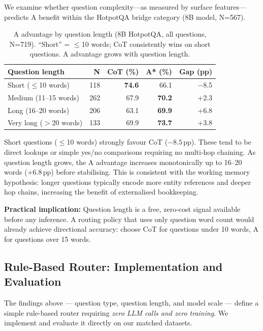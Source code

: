 \documentclass{article}
\begin{document}
We examine whether question complexity---as measured by surface features---predicts A\* benefit within the HotpotQA bridge category (8B model, N=567).

\begin{table}[h]
\centering
\caption{A\* advantage by question length (8B HotpotQA, all questions, N=719). ``Short'' = $\leq$10 words; CoT consistently wins on short questions. A\* advantage grows with question length.}
\label{tab:qlen}
\small
\begin{tabular}{lrrrr}
\toprule
Question length & N & CoT (\%) & A* (\%) & Gap (pp) \\
\midrule
Short ($\leq$10 words)   & 118 & \textbf{74.6} & 66.1 & $-$8.5 \\
Medium (11--15 words) & 262 & 67.9 & \textbf{70.2} & +2.3 \\
Long (16--20 words)   & 206 & 63.1 & \textbf{69.9} & +6.8 \\
Very long ($>$20 words)  & 133 & 69.9 & \textbf{73.7} & +3.8 \\
\bottomrule
\end{tabular}
\end{table}

Short questions ($\leq$10 words) strongly favour CoT ($-8.5$\,pp). These tend to be direct lookups or simple yes/no comparisons requiring no multi-hop chaining. As question length grows, the A\* advantage increases monotonically up to 16--20 words ($+6.8$\,pp) before stabilising. This is consistent with the working memory hypothesis: longer questions typically encode more entity references and deeper hop chains, increasing the benefit of externalised bookkeeping.

\textbf{Practical implication:} Question length is a free, zero-cost signal available before any inference. A routing policy that uses only question word count would already achieve directional accuracy: choose CoT for questions under 10 words, A\* for questions over 15 words.

\subsection{Rule-Based Router: Implementation and Evaluation}
\label{sec:router}

The findings above --- question type, question length, and model scale --- define a simple rule-based router requiring \emph{zero LLM calls and zero training}. We implement and evaluate it directly on our matched datasets.
\end{document}

